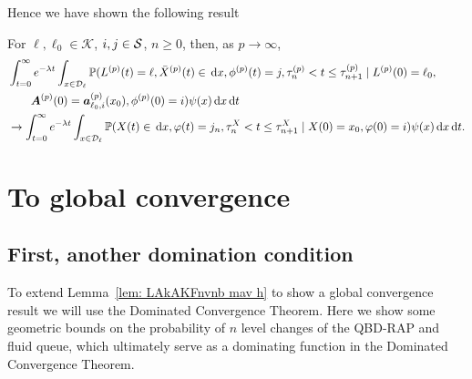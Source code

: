 Hence we have shown the following result 
\begin{lem}\label{lem: LAkAKFnvnb mav h}
	For \(\ell,\ell_0\in\mathcal K\), \(i,j\in\mathcal{S}\), \(n\geq 0\), then, as \(p\to\infty\), 
	\begin{align}
		&\int_{t=0}^\infty e^{-\lambda t}\int_{x\in\mathcal{D}_\ell}\mathbb P(L^{(p)}(t) = \ell, \bar X^{(p)}(t)\in\, \mathrm{d} x, \phi^{(p)}(t) = j, \tau_{n}^{(p)}< t\leq\tau_{n+1}^{(p)} \mid L^{(p)}(0)=\ell_0,  \nonumber 
		\\&\qquad \boldsymbol A^{(p)}(0)=\boldsymbol a_{\ell_0,i}^{(p)}(x_0), \phi^{(p)}(0)=i)\psi(x)\, \mathrm{d} x\, \mathrm{d} t \nonumber
		\\&\to\int_{t=0}^\infty e^{-\lambda t}  \int_{x\in\mathcal{D}_\ell}\mathbb P(X(t)\in\, \mathrm{d} x, \varphi(t)=j_n, \tau_n^X < t \leq \tau_{n+1}^X 
		\mid X(0)=x_0, \varphi(0)=i)\psi(x)\, \mathrm{d} x\, \mathrm{d} t.
	\end{align}
\end{lem}

\section{To global convergence}\label{sec: local to global}
\subsection{First, another domination condition}
To extend Lemma~\ref{lem: LAkAKFnvnb mav h} to show a global convergence result we will use the Dominated Convergence Theorem. Here we show some geometric bounds on the probability of \(n\) level changes of the QBD-RAP and fluid queue, which ultimately serve as a dominating function in the Dominated Convergence Theorem. 


